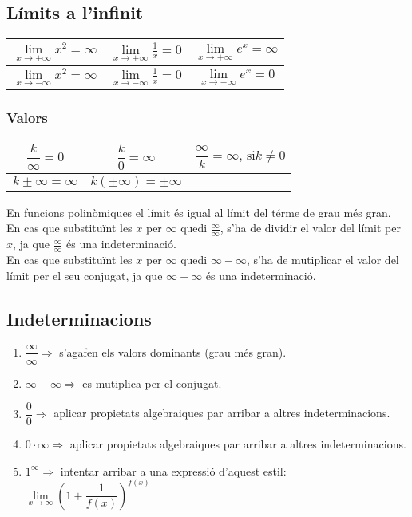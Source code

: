\documentclass[12pt,a4paper]{article}
\begin{document}
\subsection{Límits a l'infinit}

\begin{table}[!ht]
    \centering
    \begin{tabular}{c|c|c}
        $\lim\limits_{x\to +\infty} x^2=\infty$ & $\lim\limits_{x\to +\infty} \frac{1}{x}=0$ & $\lim\limits_{x\to +\infty} e^x=\infty$ \\ \hline
        $\lim\limits_{x\to -\infty} x^2=\infty$ & $\lim\limits_{x\to -\infty} \frac{1}{x}=0$ &$\lim\limits_{x\to -\infty} e^x=0$ \\ 
    \end{tabular}
\end{table}

\subsubsection{Valors}
\begin{table}[!ht]
    \centering
    \begin{tabular}{c|c|c}
        $\dfrac{k}{\infty}=0$ & $\dfrac{k}{0}=\infty$ & $\dfrac{\infty}{k}=\infty \text{, si} k \neq 0$ \\[10pt] \hline
        $k \pm \infty = \infty$ & $k\left(\pm\infty\right) =\pm\infty$ & $\phantom{\downarrow\uparrow}$ \\[10pt]
    \end{tabular}
\end{table}
En funcions polinòmiques el límit és igual al límit del térme de grau més gran.\\[10pt]
En cas que substituïnt les $x$ per $\infty$ quedi $\frac{\infty}{\infty}$, s'ha de dividir el valor del límit per $x$, ja que $\frac{\infty}{\infty}$ és una indeterminació.\\[10pt]
En cas que substituïnt les $x$ per $\infty$ quedi $\infty-\infty$, s'ha de mutiplicar el valor del límit per el seu conjugat, ja que $\infty - \infty$ és una indeterminació.\\[10pt]
\subsection{Indeterminacions}
\begin{enumerate}[label=]
    \item $\dfrac{\infty}{\infty} \Rightarrow$ s'agafen els valors dominants (grau més gran).
    \item $\infty -\infty \Rightarrow$ es mutiplica per el conjugat.
    \item $\dfrac{0}{0} \Rightarrow$ aplicar propietats algebraiques par arribar a altres indeterminacions.
    \item $0 \cdot \infty\Rightarrow$ aplicar propietats algebraiques par arribar a altres indeterminacions.
    \item $1^\infty\Rightarrow$ intentar arribar a una expressió d'aquest estil: $\lim\limits_{x\to\infty}\left(1 +\dfrac{1}{f(x)}\right)^{f(x)}$
\end{enumerate}
\end{document}
